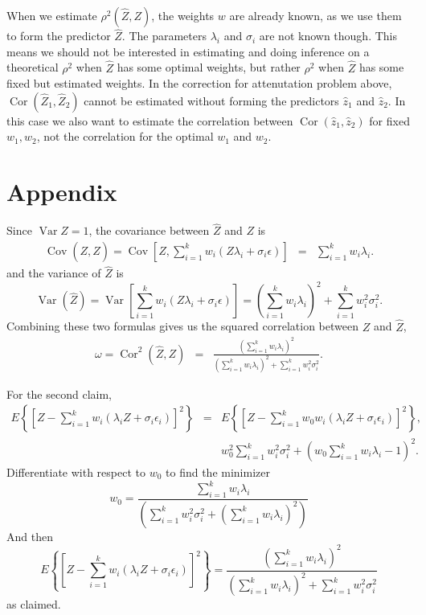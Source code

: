 \documentclass{article}
\makeatletter
\theoremstyle{plain}
\theoremstyle{plain}
\theoremstyle{definition}
\theoremstyle{remark}
\theoremstyle{definition}
\theoremstyle{plain}
\theoremstyle{plain}
\theoremstyle{definition}
\newenvironment{proof}[1][\protect\proofname]{\par
	\normalfont\topsep6\p@\@plus6\p@\relax
	\trivlist
	\itemindent\parindent
	\item[\hskip\labelsep\scshape #1]\ignorespaces
}{%
	\endtrivlist\@endpefalse
}
\providecommand{\proofname}{Proof}
\DeclareMathOperator{\Var}{Var}
\DeclareMathOperator{\Cor}{Cor}
\DeclareMathOperator{\Cov}{Cov}
\makeatother
\begin{document}
When we estimate $\rho^{2}(\widehat{Z},Z)$, the weights
$w$ are already known, as we use them to form the predictor $\widehat{Z}$.
The parameters $\lambda_{i}$ and $\sigma_{i}$ are not known though.
This means we should not be interested in estimating and doing inference
on a theoretical $\rho^{2}$ when $\widehat{Z}$ has some optimal
weights, but rather $\rho^{2}$ when $\widehat{Z}$ has some fixed
but estimated weights. In the correction for attenutation problem
above, $\Cor(\widehat{Z}_{1},\widehat{Z}_{2})$ cannot
be estimated without forming the predictors $\widehat{z}_{1}$ and
$\widehat{z}_{2}$. In this case we also want to estimate the correlation
between $\Cor(\widehat{z}_{1},\widehat{z}_{2})$ for fixed
$w_{1},w_{2}$, not the correlation for the optimal $w_{1}$ and $w_{2}$.

\section{Appendix}

\begin{proof}[Proof of Proposition \ref{prop:reliability motivation}]\label{proof:reliability motivation}
Since $\Var Z=1$, the covariance between $\widehat{Z}$ and $Z$
is
\begin{eqnarray*}
\Cov\left(Z,\widehat{Z}\right)=\Cov\left[Z,\sum_{i=1}^{k}w_{i}\left(Z\lambda_{i}+\sigma_{i}\epsilon\right)\right] & = & \sum_{i=1}^{k}w_{i}\lambda_{i}.
\end{eqnarray*}
and the variance of $\widehat{Z}$ is
\[
\Var\left(\widehat{Z}\right)=\Var\left[\sum_{i=1}^{k}w_{i}\left(Z\lambda_{i}+\sigma_{i}\epsilon\right)\right]=\left(\sum_{i=1}^{k}w_{i}\lambda_{i}\right)^{2}+\sum_{i=1}^{k}w_{i}^{2}\sigma_{i}^{2}.
\]
Combining these two formulas gives us the squared correlation between
$Z$ and $\widehat{Z}$,
\begin{eqnarray*}
\omega=\Cor^{2}\left(\widehat{Z},Z\right) & = & \frac{\left(\sum_{i=1}^{k}w_{i}\lambda_{i}\right)^{2}}{\left(\sum_{i=1}^{k}w_{i}\lambda_{i}\right)^{2}+\sum_{i=1}^{k}w_{i}^{2}\sigma_{i}^{2}}.
\end{eqnarray*}

For the second claim,
\begin{eqnarray*}
E\left\{ \left[Z-\sum_{i=1}^{k}w_{i}\left(\lambda_{i}Z+\sigma_{i}\epsilon_{i}\right)\right]^{2}\right\}  & = & E\left\{ \left[Z-\sum_{i=1}^{k}w_{0}w_{i}\left(\lambda_{i}Z+\sigma_{i}\epsilon_{i}\right)\right]^{2}\right\} ,\\
 &  & w_{0}^{2}\sum_{i=1}^{k}w_{i}^{2}\sigma_{i}^{2}+\left(w_{0}\sum_{i=1}^{k}w_{i}\lambda_{i}-1\right)^{2}.
\end{eqnarray*}
Differentiate with respect to $w_{0}$ to find the minimizer
\[
w_{0}=\frac{\sum_{i=1}^{k}w_{i}\lambda_{i}}{\left(\sum_{i=1}^{k}w_{i}^{2}\sigma_{i}^{2}+\left(\sum_{i=1}^{k}w_{i}\lambda_{i}\right)^{2}\right)}
\]
And then
\[
E\left\{ \left[Z-\sum_{i=1}^{k}w_{i}\left(\lambda_{i}Z+\sigma_{i}\epsilon_{i}\right)\right]^{2}\right\} =\frac{\left(\sum_{i=1}^{k}w_{i}\lambda_{i}\right)^{2}}{\left(\sum_{i=1}^{k}w_{i}\lambda_{i}\right)^{2}+\sum_{i=1}^{k}w_{i}^{2}\sigma_{i}^{2}}
\]
as claimed.
\end{proof}
\end{document}
